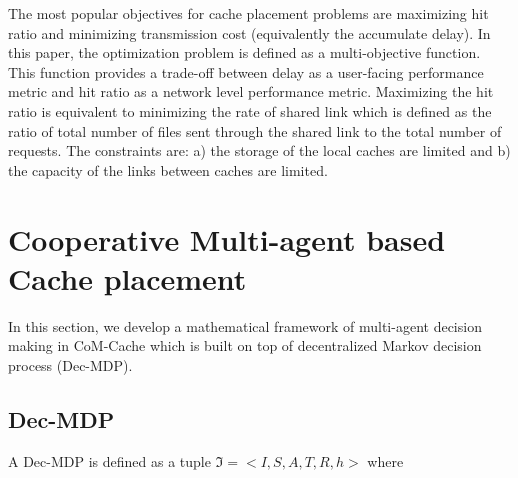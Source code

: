 \documentclass[journal,onecolumn]{IEEEtran}
\begin{document}
The most popular objectives for cache placement problems are maximizing hit ratio and minimizing transmission cost (equivalently the accumulate delay).
In this paper, the optimization problem is defined as a multi-objective function. This function provides a trade-off between delay as a user-facing performance metric and hit ratio as a network level performance metric. Maximizing the hit ratio is equivalent to minimizing the rate of shared link which is defined as the ratio of total number of files sent through the shared link to the total number of requests. The constraints are: a) the storage of the local caches are limited and b) the capacity of the links between caches are limited. 


\section{Cooperative Multi-agent based Cache placement}
\label{method}
In this section, we develop a mathematical framework of multi-agent decision making in CoM-Cache which is built on top of decentralized Markov decision process (Dec-MDP). 

\subsection{Dec-MDP}
A Dec-MDP is defined as a tuple $\Im=<I,S,A,T,R,h>$
where
\end{document}
